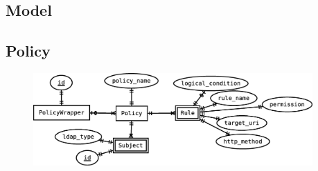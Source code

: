 \subsection{Model}
\lipsum[2]

\subsection{Policy}
\lipsum[3]
\begin{figure}[h]
 \centering
 \includegraphics[keepaspectratio=true,width=0.95\textwidth]{figures/policy}
\end{figure}